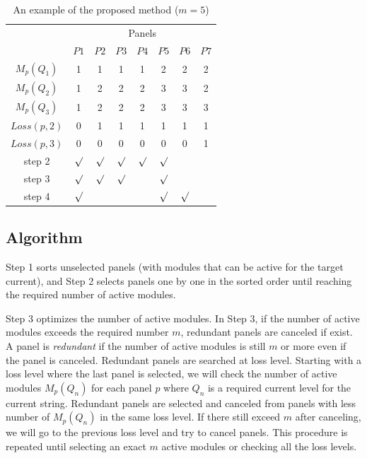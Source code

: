 \documentclass[conference]{IEEEtran}
\begin{document}
\begin{table}[t]
\caption{An example of the proposed method ($m = 5$)}
\begin{center}
\begin{tabular}{c|c|ccccc|c}\hline \hline
                               & \multicolumn{7}{c}{Panels}  \\
                               &  \multicolumn{1}{c}{$P1$}    & $P2$   & $P3$    & $P4$    & $P5$   & \multicolumn{1}{c}{$P6$}            & $P7$             \\ \hline
$M_{p}(Q_1)$        & 1     & 1     & 1     & 1     & 2    & 2    & 2              \\ \hline
$M_{p}(Q_2)$        & 1     & 2     & 2     & 2     & 3    & 3    & 2              \\ \hline
$M_{p}(Q_3)$        & 1     & 2     & 2     & 2     & 3    & 3    & 3              \\ \hline
$Loss(p,2)$           & 0     & 1     & 1     & 1     & 1    & 1    & 1    \\ \hline
$Loss(p,3)$           & 0     & 0     & 0     & 0     & 0    & 0    & 1    \\ \hline\hline
step 2        & $\surd$ & $\surd$ &$\surd$ &$\surd$ &$\surd$ & & \\ \hline
step 3      & $\surd$ & $\surd$ &$\surd$ & &$\surd$ & & \\ \hline
step 4       & $\surd$ &  & & &$\surd$ & $\surd$ & \\ \hline         
\end{tabular}
\end{center}
\label{tab:proposed-example}
\end{table}

\subsection{Algorithm}
Step 1 sorts unselected panels (with modules that can be active for the target current), and Step 2 selects panels one by one in the sorted order until reaching the required number of active modules.  

Step 3 optimizes the number of active modules. 
In Step 3, if the number of active modules exceeds the required number $m$, redundant panels are canceled if exist. 
A panel is \textit{redundant} if the number of active modules is still $m$ or more even if the panel is canceled.  
Redundant panels are searched at loss level. 
Starting with a loss level where the last panel is selected, we will check the number of active modules $M_{p}(Q_{n})$ for each panel $p$ 
where $Q_{n}$ is a required current level for the current string.
Redundant panels are selected and canceled from panels with less number of $M_{p}(Q_{n})$ in the same loss level. 
If there still exceed $m$ after canceling, we will go to the previous loss level and try to cancel panels.
This procedure is repeated until selecting an exact $m$ active modules or checking all the loss levels.
\end{document}
